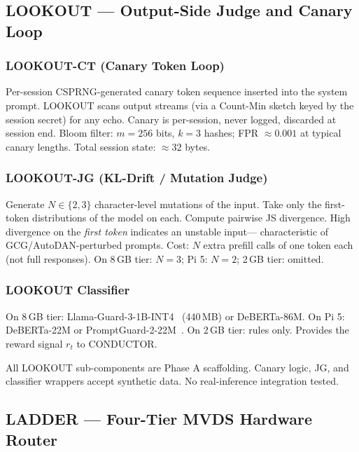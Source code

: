 \documentclass[11pt,a4paper]{article}
\begin{document}
\subsection{LOOKOUT — Output-Side Judge and Canary Loop}

\subsubsection*{LOOKOUT-CT (Canary Token Loop)}

Per-session CSPRNG-generated canary token sequence inserted into the system prompt.
LOOKOUT scans output streams (via a Count-Min sketch keyed by the session secret)
for any echo.
Canary is per-session, never logged, discarded at session end.
Bloom filter: $m = 256$ bits, $k = 3$ hashes; FPR $\approx 0.001$ at typical
canary lengths.
Total session state: $\approx 32$ bytes.

\subsubsection*{LOOKOUT-JG (KL-Drift / Mutation Judge)}

Generate $N \in \{2, 3\}$ character-level mutations of the input.
Take only the first-token distributions of the model on each.
Compute pairwise JS divergence.
High divergence on the \emph{first token} indicates an unstable input---
characteristic of GCG/AutoDAN-perturbed prompts.
Cost: $N$ extra prefill calls of one token each (not full responses).
On 8\,GB tier: $N=3$; Pi 5: $N=2$; 2\,GB tier: omitted.

\subsubsection*{LOOKOUT Classifier}

On 8\,GB tier: Llama-Guard-3-1B-INT4~\citep{inan2023llama_guard} (440\,MB) or
DeBERTa-86M.
On Pi 5: DeBERTa-22M or PromptGuard-2-22M~\citep{llamafirewall2025}.
On 2\,GB tier: rules only.
Provides the reward signal $r_t$ to CONDUCTOR.

\begin{scaffoldbox}
All LOOKOUT sub-components are Phase A scaffolding. Canary logic, JG, and classifier
wrappers accept synthetic data. No real-inference integration tested.
\end{scaffoldbox}

\subsection{LADDER — Four-Tier MVDS Hardware Router}
\end{document}
